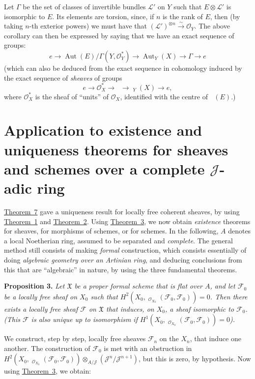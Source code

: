 \documentclass{article}
\newenvironment{itenv}[1]
  {\phantomsection\par\medskip\noindent\textbf{#1.}\itshape}
  {\medskip}
\newcommand{\scr}[1]{{\mathscr{#1}}}
\newcommand{\fk}{\mathfrak}
\DeclareMathOperator{\Hom}{Hom}
\DeclareMathOperator{\Aut}{Aut}
\DeclareMathOperator{\shHom}{\underline{\Hom}}
\DeclareMathOperator{\shAut}{\underline{\Aut}}
\newcommand{\oldpage}[1]{\marginpar{\footnotesize$\Big\vert$ \textit{p.~#1}}}
\begin{document}
Let $\Gamma$ be the set of classes of invertible bundles $\scr{L}'$ on $Y$ such that $E\otimes\scr{L}'$ is isomorphic to $E$.
Its elements are torsion, since, if $n$ is the rank of $E$, then (by taking $n$-th exterior powers) we must have that $(\scr{L}')^{\otimes n}\xrightarrow{\sim}\scr{O}_Y$.
The above corollary can then be expressed by saying that we have an exact sequence of groups:
\[
  e \to \Aut(E)/\Gamma(Y,\scr{O}_Y^*) \to \Aut_Y(X) \to \Gamma \to e
\]
(which can also be deduced from the exact sequence in cohomology induced by the exact sequence of \emph{sheaves} of groups
\oldpage{182-11}
\[
  e \to \scr{O}_X^* \to \shAut \to \shAut_Y(X) \to e,
\]
where $\scr{O}_X^*$ is the sheaf of ``units'' of $\scr{O}_X$, identified with the centre of $\shAut(E)$.)


\section{Application to existence and uniqueness theorems for sheaves and schemes over a complete \texorpdfstring{$\mathscr{J}$}{J}-adic ring}
\label{section6}

\hyperref[theorem7]{Theorem~7} gave a uniqueness result for locally free coherent sheaves, by using \hyperref[theorem1]{Theorem~1} and \hyperref[theorem2]{Theorem~2}.
Using \hyperref[theorem3]{Theorem~3}, we now obtain \emph{existence} theorems for sheaves, for morphisms of schemes, or for schemes.
In the following, $A$ denotes a local Noetherian ring, assumed to be separated and \emph{complete}.
The general method still consists of making \emph{formal} construction, which consists essentially of doing \emph{algebraic geometry over an Artinian ring}, and deducing conclusions from this that are ``algebraic'' in nature, by using the three fundamental theorems.

\begin{itenv}{Proposition 3}
\label{proposition3}
  Let $\fk{X}$ be a proper formal scheme that is flat over $A$, and let $\scr{F}_0$ be a locally free sheaf on $X_0$ such that $H^2(X_0,\shHom_{\scr{O}_{X_0}}(\scr{F}_0,\scr{F}_0))=0$.
  Then there exists a locally free sheaf $\scr{F}$ on $\fk{X}$ that induces, on $X_0$, a sheaf isomorphic to $\scr{F}_0$.
  (This $\scr{F}$ is also unique up to isomorphism if $H^1(X_0,\shHom_{\scr{O}_{X_0}}(\scr{F}_0,\scr{F}_0))=0$).
\end{itenv}

We construct, step by step, locally free sheaves $\scr{F}_n$ on the $X_n$, that induce one another.
The construction of $\scr{F}_0$ is met with an obstruction in $H^2(X_0,\shHom_{\scr{O}_{X_0}}(\scr{F}_0,\scr{F}_0))\otimes_{A/\scr{J}}(\scr{J}^n/\scr{J}^{n+1})$, but this is zero, by hypothesis.
Now using \hyperref[theorem3]{Theorem~3}, we obtain:
\end{document}
